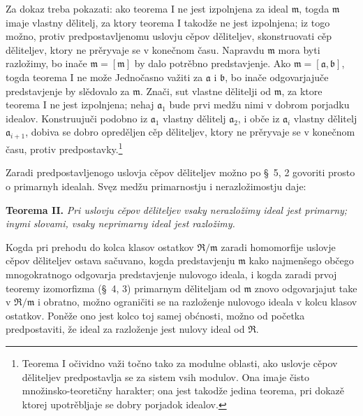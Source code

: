\documentclass[11pt]{article}
\providecommand{\mR}{\mathfrak{R}}
\providecommand{\ma}{\mathfrak{a}}
\providecommand{\mb}{\mathfrak{b}}
\providecommand{\mm}{\mathfrak{m}}
\begin{document}
Za dokaz treba pokazati: ako teorema I ne jest izpolnjena za ideal $\mm$, togda $\mm$ imaje vlastny dělitelj, za ktory teorema I takodže ne jest izpolnjena; iz togo možno, protiv predpostavljenomu uslovju cěpov děliteljev, skonstruovati cěp děliteljev, ktory ne prěryvaje se v konečnom času. Napravdu $\mm$ mora byti razložimy, bo inače $\mm=[\mm]$ by dalo potrěbno predstavjenje. Ako $\mm=[\ma,\mb]$, togda teorema I ne može Jednočasno važiti za $\ma$ i $\mb$, bo inače odgovarjajuče predstavjenje by slědovalo za $\mm$. Znači, sut vlastne dělitelji od $\mm$, za ktore teorema I ne jest izpolnjena; nehaj $\ma_1$ bude prvi medžu nimi v dobrom porjadku idealov. Konstruujuči podobno iz $\ma_1$ vlastny dělitelj $\ma_2$, i obče iz $\ma_i$ vlastny dělitelj $\ma_{i+1}$, dobiva se dobro opreděljen cěp děliteljev, ktory ne prěryvaje se v konečnom času, protiv predpostavky.\footnote{Teorema I očividno važi točno tako za modulne oblasti, ako uslovje cěpov děliteljev predpostavlja se za sistem vsih modulov. Ona imaje čisto množinsko-teoretičny harakter; ona jest takodže jedina teorema, pri dokazě ktorej upotrěbljaje se dobry porjadok idealov.}

Zaradi predpostavljenogo uslovja cěpov děliteljev možno po \S~5, 2 govoriti prosto o primarnyh idealah. Svęz medžu primarnostju i nerazložimostju daje:

\textbf{Teorema II.} \emph{Pri uslovju cěpov děliteljev vsaky nerazložimy ideal jest primarny; inymi slovami, vsaky neprimarny ideal jest razložimy.}

Kogda pri prehodu do kolca klasov ostatkov $\mR/\mm$ zaradi homomorfije uslovje cěpov děliteljev ostava sačuvano, kogda predstavjenju $\mm$ kako najmenšego občego mnogokratnogo odgovarja predstavjenje nulovogo ideala, i kogda zaradi prvoj teoremy izomorfizma (\S~4, 3) primarnym děliteljam od $\mm$ znovo odgovarjajut take v $\mR/\mm$ i obratno, možno ograničiti se na razloženje nulovogo ideala v kolcu klasov ostatkov. Poněže ono jest kolco toj samej obćnosti, možno od početka predpostaviti, že ideal za razloženje jest nulovy ideal od $\mR$.
\end{document}
